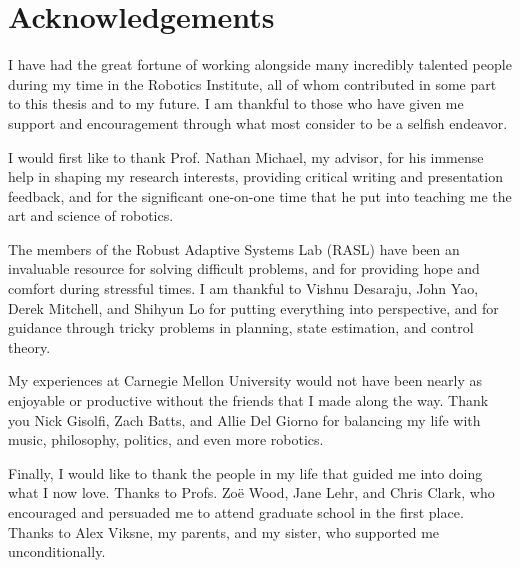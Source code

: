 \section*{Acknowledgements}

I have had the great fortune of working alongside many incredibly talented people
during my time in the Robotics Institute, all of whom contributed in some part to
this thesis and to my future. I am thankful to those who have given me support
and encouragement through what most consider to be a selfish endeavor.

I would first like to thank Prof. Nathan Michael, my advisor, for his immense
help in shaping my research interests, providing critical writing and
presentation feedback, and for the significant one-on-one time that he put into teaching me
the art and science of robotics.

The members of the Robust Adaptive Systems Lab (RASL) have been an invaluable
resource for solving difficult problems, and for providing hope and comfort
during stressful times. I am thankful to Vishnu Desaraju, John Yao,
Derek Mitchell, and Shihyun Lo for putting everything into perspective, and for
guidance through tricky problems in planning, state estimation, and control
theory.

My experiences at Carnegie Mellon University would not have been nearly as
enjoyable or productive without the friends that I made along the way. Thank you
Nick Gisolfi, Zach Batts, and Allie Del Giorno for balancing my life with music,
philosophy, politics, and even more robotics.

Finally, I would like to thank the people in my life that guided me into doing
what I now love. Thanks to Profs. Zo\"{e} Wood, Jane Lehr, and Chris Clark, who
encouraged and persuaded me to attend graduate school in the first place.
Thanks to Alex Viksne, my parents, and my sister, who supported me unconditionally.
